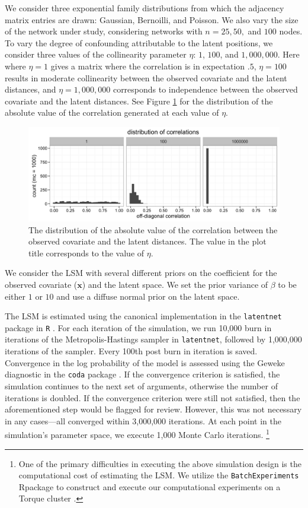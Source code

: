 \documentclass[11pt]{article}
\newcommand{\R}{\textsf{R}\space} %
\begin{document}
We consider three exponential family distributions from which the adjacency matrix entries are drawn: Gaussian, Bernoilli, and Poisson.  We also vary the size of the network under study, considering networks with $n = 25, 50,$ and $100$ nodes. To vary the degree of confounding attributable to the latent positions, we consider three values of the collinearity parameter $\eta$: $1$, $100$, and $1,000,000$. Here  where $\eta = 1$ gives a matrix where the correlation is in expectation $.5$, $\eta = 100$ results in moderate collinearity between the observed covariate and the latent distances, and $\eta = 1,000,000$ corresponds to independence between the observed covariate and the latent distances. See Figure \ref{fig:vine} for the distribution of the absolute value of the correlation generated at each value of $\eta$.

\begin{figure}
\includegraphics[width=\textwidth]{figures/max_r_vine.png}
\caption{The distribution of the absolute value of the correlation between the observed covariate and the latent distances. The value in the plot title corresponds to the value of $\eta$. \label{fig:vine}}
\end{figure}

We consider the LSM with several different priors on the coefficient
for the observed covariate ($\mathbf{x}$) and the latent space. We set the prior
variance of $\beta$ to be either $1$ or $10$ and use a diffuse normal
prior on the latent space.

The LSM is estimated using the canonical implementation in the
\texttt{latentnet} package in \texttt{R} \citep{latentnet}. For each
iteration of the simulation, we run 10,000 burn in iterations of the Metropolis-Hastings sampler in \texttt{latentnet},
followed by 1,000,000 iterations of the sampler. Every 100th post burn
in iteration is saved. Convergence in the log probability of the model
is assessed using the Geweke diagnostic in the \texttt{coda} package
\citep{coda, geweke1991evaluating}. If the convergence criterion is
satisfied, the simulation continues to the next set of arguments,
otherwise the number of iterations is doubled. If the convergence
criterion were still not satisfied, then the aforementioned step would be flagged for review. However, this was not necessary in
any cases---all converged within 3,000,000 iterations. At each point in the simulation's parameter space, we
execute 1,000 Monte Carlo iterations. \footnote{One of the primary
  difficulties in executing the above simulation design is the
  computational cost of estimating the LSM. We utilize the
  \texttt{BatchExperiments} \R package to construct and execute our
  computational experiments on a Torque cluster
  \cite{bischl2015batchjobs}.}
\end{document}
